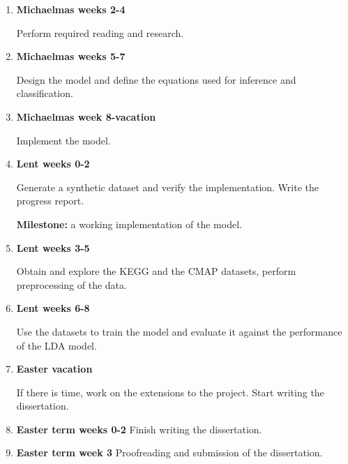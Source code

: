 \documentclass[12pt,a4]{article}
\begin{document}
\begin{enumerate}

\item {\bf Michaelmas weeks 2-4} 

Perform required reading and research.

\item {\bf Michaelmas weeks 5-7} 

Design the model and define the equations used for inference and classification.

\item {\bf Michaelmas week 8-vacation} 

Implement the model.

\item {\bf Lent weeks 0-2} 

Generate a synthetic dataset and verify the implementation. Write the progress report. 

\textbf{Milestone:} a working implementation of the model.

\item {\bf Lent weeks 3-5} 

Obtain and explore the KEGG and the CMAP datasets, perform preprocessing of the data.

\item {\bf Lent weeks 6-8}

Use the datasets to train the model and evaluate it against the performance of the LDA model.

\item {\bf Easter vacation} 

If there is time, work on the extensions to the project. Start writing the dissertation.

\item {\bf Easter term weeks 0-2} Finish writing the dissertation. 

\item {\bf Easter term week 3} Proofreading and submission of the dissertation.

\end{enumerate}



\end{document}
